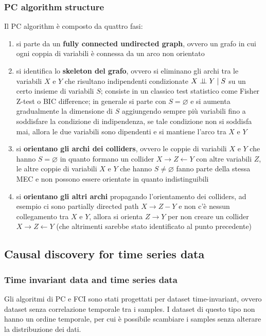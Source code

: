 \subsubsection*{PC algorithm structure}
Il PC algorithm è composto da quattro fasi:
\begin{enumerate}
	\item si parte da un \textbf{fully connected undirected graph}, ovvero un grafo in cui ogni coppia di variabili
	è connessa da un arco non orientato
	\item si identifica lo \textbf{skeleton del grafo}, ovvero si eliminano gli archi tra le variabili \(X\) e \(Y\)
	che risultano indipendenti condizionate \(X \perp \!\!\! \perp Y \mid S\) su un certo insieme di variabili \(S\); consiste
	in un classico test statistico come Fisher Z-test o BIC difference; in generale si parte con \(S = \varnothing\)
	e si aumenta gradualmente la dimensione di \(S\) aggiungendo sempre più variabili fino a soddisfare la condizione
	di indipendenza, se tale condizione non si soddisfa mai, allora le due variabili sono dipendenti e si mantiene
	l'arco tra \(X\) e \(Y\)
	\item si \textbf{orientano gli archi dei colliders}, ovvero le coppie di variabili \(X\) e \(Y\) che hanno
	\(S = \varnothing\) in quanto formano un collider \(X \to Z \leftarrow Y\) con altre variabili \(Z\), le
	altre coppie di variabili \(X\) e \(Y\) che hanno \(S \neq \varnothing\) fanno parte della stessa MEC e non
	possono essere orientate in quanto indistinguibili
	\item si \textbf{orientano gli altri archi} propagando l'orientamento dei colliders, ad esempio ci sono partially
	directed path \(X \to Z - Y\) e non c'è nessun collegamento tra \(X\) e \(Y\), allora si orienta \(Z \to Y\) per
	non creare un collider \(X \to Z \leftarrow Y\) (che altrimenti sarebbe stato identificato al punto precedente)
\end{enumerate}

\newpage

\subsection{Causal discovery for time series data}
\subsubsection*{Time invariant data and time series data}
Gli algoritmi di PC e FCI sono stati progettati per dataset time-invariant, ovvero dataset senza correlazione temporale
tra i samples. I dataset di questo tipo non hanno un ordine temporale, per cui è possibile scambiare i samples senza
alterare la distribuzione dei dati.

